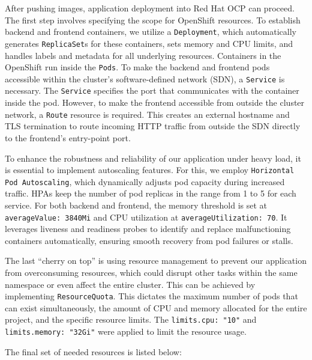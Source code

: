 After pushing images, application deployment into Red Hat OCP can proceed. The first step involves specifying the scope for OpenShift resources. To establish backend and frontend containers, we utilize a \texttt{Deployment}, which automatically generates \texttt{ReplicaSet}s  for these containers, sets memory and CPU limits, and handles labels and metadata for all underlying resources. Containers in the OpenShift run inside the \texttt{Pods}. To make the backend and frontend pods accessible within the cluster's software-defined network (SDN), a \texttt{Service} is necessary. The \texttt{Service} specifies the port that communicates with the container inside the pod. However, to make the frontend accessible from outside the cluster network, a \texttt{Route} resource is required. This creates an external hostname and TLS termination to route incoming HTTP traffic from outside the SDN directly to the frontend's entry-point port.

To enhance the robustness and reliability of our application under heavy load, it is essential to implement autoscaling features. For this, we employ \texttt{Horizontal Pod Autoscaling}, which dynamically adjusts pod capacity during increased traffic. HPAs keep the number of pod replicas in the range from 1 to 5 for each service. For both backend and frontend, the memory threshold is set at \texttt{averageValue: 3840Mi} and CPU utilization at \texttt{averageUtilization: 70}. It leverages liveness and readiness probes to identify and replace malfunctioning containers automatically, ensuring smooth recovery from pod failures or stalls.

\label{resquota}
The last \enquote{cherry on top} is using resource management to prevent our application from overconsuming resources, which could disrupt other tasks within the same namespace or even affect the entire cluster. This can be achieved by implementing \texttt{ResourceQuota}. This dictates the maximum number of pods that can exist simultaneously, the amount of CPU and memory allocated for the entire project, and the specific resource limits. The \texttt{limits.cpu: "10"} and \texttt{limits.memory: "32Gi"} were applied to limit the resource usage.

The final set of needed resources is listed below: 

